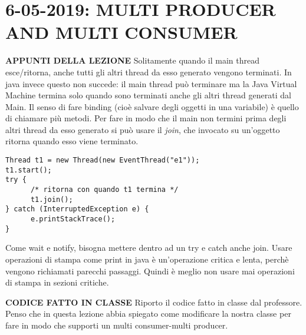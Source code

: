 

\newpage
\section{6-05-2019: MULTI PRODUCER AND MULTI CONSUMER}
\noindent \textbf{APPUNTI DELLA LEZIONE} \newline
Solitamente quando il main thread esce/ritorna, anche tutti gli altri thread da esso generato vengono terminati. In java invece questo non succede: il main thread può terminare ma la Java Virtual Machine termina solo quando sono terminati anche gli altri thread generati dal Main.\newline
Il senso di fare binding (cioè salvare degli oggetti in una variabile) è quello di chiamare più metodi. \newline
Per fare in modo che il main non termini prima degli altri thread da esso generato si può usare il \textit{join}, che invocato su un'oggetto ritorna quando esso viene terminato.
\begin{lstlisting}
Thread t1 = new Thread(new EventThread("e1"));
t1.start();
try {
	  /* ritorna con quando t1 termina */
      t1.join();
} catch (InterruptedException e) {
      e.printStackTrace();
}
\end{lstlisting}
\noindent Come wait e notify, bisogna mettere dentro ad un try e catch anche join. \newline
Usare operazioni di stampa come print in java è un'operazione critica e lenta, perchè vengono richiamati parecchi passaggi. Quindi è meglio non usare mai operazioni di stampa in sezioni critiche.


\noindent \textbf{CODICE FATTO IN CLASSE} \newline
Riporto il codice fatto in classe dal professore. \newline
Penso che in questa lezione abbia spiegato come modificare la nostra classe per fare in modo che supporti un multi consumer-multi producer.

